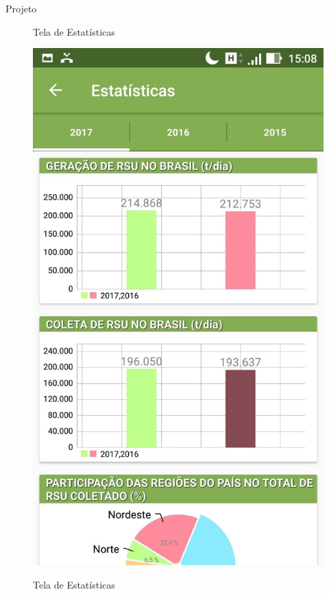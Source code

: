\documentclass[
	12pt,				%
	openany,			%
	twoside,			%
	a4paper,			%
	english,			%
	french,				%
	spanish,			%
	brazil				%
	]{abntex2}
\begin{document}
\begin{chapter}{Projeto}
    \begin{figure}[htb]    
 \centering
  \begin{minipage}{0.45\textwidth}
    \centering
    \caption{Tela de Estatísticas}
    \includegraphics[scale=0.35]{media/tela_stats_1.jpg}
     \label{fig:tela_stats_1}
  \end{minipage}
  \hfill
  \begin{minipage}{0.45\textwidth}
    \centering
    \caption{Tela de Estatísticas}

\end{minipage}
\end{figure}
\end{chapter}
\end{document}
